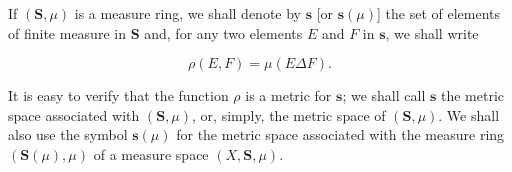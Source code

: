 If $(\mathbf{S},\mu)$ is a measure ring, we shall denote by $\mathbf{s}$ [or $\mathbf{s}(\mu)$] the set of elements of finite measure in $\mathbf{S}$ and, for any two elements $E$ and $F$ in $\mathbf{s}$, we shall write

$$\rho(E,F) = \mu(E \Delta F).$$

It is easy to verify that the function $\rho$ is a metric for $\mathbf{s}$; we shall call $\mathbf{s}$ the metric space associated with $(\mathbf{S},\mu)$, or, simply, the metric space of $(\mathbf{S},\mu)$. We shall also use the symbol $\mathbf{s}(\mu)$ for the metric space associated with the measure ring $(\mathbf{S}(\mu),\mu)$ of a measure space $(X,\mathbf{S},\mu)$.
